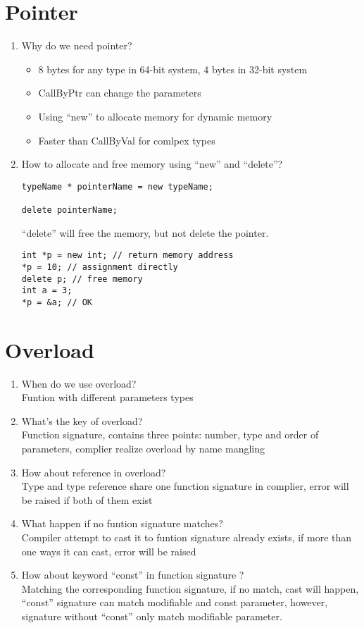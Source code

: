 \documentclass[10pt,a4paper,oneside]{article}
\begin{document}
\section{Pointer}
\begin{enumerate}[1.]
\item Why do we need pointer?
\begin{itemize}
\item 8 bytes for any type in 64-bit system, 4 bytes in 32-bit system
\item CallByPtr can change the parameters
\item Using ``new'' to allocate memory for dynamic memory
\item Faster than CallByVal for comlpex types
\end{itemize}
\item How to allocate and free memory using ``new'' and ``delete''?\\
\begin{lstlisting}
typeName * pointerName = new typeName;

delete pointerName;
\end{lstlisting}
``delete'' will free the memory, but not delete the pointer.
\begin{lstlisting}
int *p = new int; // return memory address
*p = 10; // assignment directly
delete p; // free memory
int a = 3;
*p = &a; // OK
\end{lstlisting}
\end{enumerate}
\section{Overload}
\begin{enumerate}[1.]
\item When do we use overload?\\
Funtion with different parameters types
\item What's the key of overload?\\
Function signature, contains three points: number, type and order of parameters, complier realize overload by name mangling
\item How about reference in overload?\\
Type and type reference share one function signature in complier, error will be raised if both of them exist
\item What happen if no funtion signature matches?\\
Compiler attempt to cast it to funtion signature already exists, if more than one ways it can cast, error will be raised
\item How about keyword ``const'' in function signature ?\\
Matching the corresponding function signature, if no match,  cast will happen, ``const'' signature can match modifiable and const parameter, however, signature without ``const'' only match modifiable parameter.
\end{enumerate}
\end{document}
